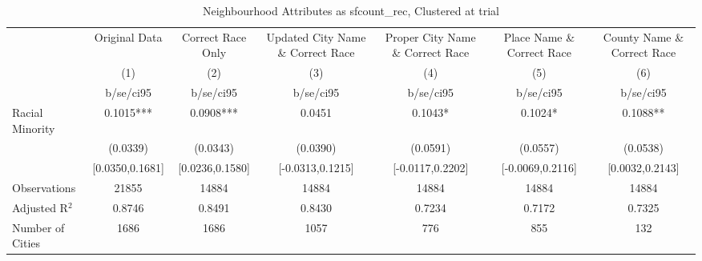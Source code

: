 \documentclass{article}
\begin{document}
\begin{table}[htbp]\centering
\def\sym#1{\ifmmode^{#1}\else\(^{#1}\)\fi}
\caption{Neighbourhood Attributes as sfcount\_rec, Clustered at trial}
\begin{tabular}{l*{6}{c}}
\toprule
                    &\multicolumn{1}{c}{Original Data}&\multicolumn{1}{c}{Correct Race Only}&\multicolumn{1}{c}{Updated City Name \& Correct Race}&\multicolumn{1}{c}{Proper City Name \& Correct Race}&\multicolumn{1}{c}{Place Name \& Correct Race}&\multicolumn{1}{c}{County Name \& Correct Race}\\\cmidrule(lr){2-2}\cmidrule(lr){3-3}\cmidrule(lr){4-4}\cmidrule(lr){5-5}\cmidrule(lr){6-6}\cmidrule(lr){7-7}
                    &\multicolumn{1}{c}{(1)}   &\multicolumn{1}{c}{(2)}   &\multicolumn{1}{c}{(3)}   &\multicolumn{1}{c}{(4)}   &\multicolumn{1}{c}{(5)}   &\multicolumn{1}{c}{(6)}   \\
                    &   b/se/ci95   &   b/se/ci95   &   b/se/ci95   &   b/se/ci95   &   b/se/ci95   &   b/se/ci95   \\
\midrule
Racial Minority     &      0.1015***&      0.0908***&      0.0451   &      0.1043*  &      0.1024*  &      0.1088** \\
                    &    (0.0339)   &    (0.0343)   &    (0.0390)   &    (0.0591)   &    (0.0557)   &    (0.0538)   \\
                    &[0.0350,0.1681]   &[0.0236,0.1580]   &[-0.0313,0.1215]   &[-0.0117,0.2202]   &[-0.0069,0.2116]   &[0.0032,0.2143]   \\
\midrule
Observations        &       21855   &       14884   &       14884   &       14884   &       14884   &       14884   \\
Adjusted R$^2$      &      0.8746   &      0.8491   &      0.8430   &      0.7234   &      0.7172   &      0.7325   \\
Number of Cities    &        1686   &        1686   &        1057   &         776   &         855   &         132   \\
\bottomrule
\end{tabular}
\end{table}
\end{document}
